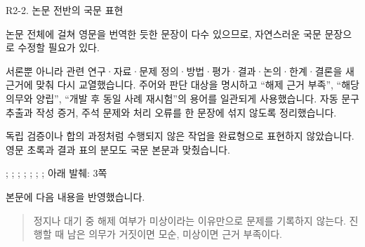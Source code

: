 \begin{reviewitem}{R2-2. 논문 전반의 국문 표현}

\begin{reviewercomment}

논문 전체에 걸쳐 영문을 번역한 듯한 문장이 다수 있으므로, 자연스러운 국문 문장으로 수정할 필요가 있다.

\end{reviewercomment}

\begin{authorresponse}

서론뿐 아니라 관련 연구·자료·문제 정의·방법·평가·결과·논의·한계·결론을 새 근거에 맞춰 다시 교열했습니다. 주어와 판단 대상을 명시하고 ``해제 근거 부족'', ``해당 의무와 양립'', ``개발 후 동일 사례 재시험''의 용어를 일관되게 사용했습니다. 자동 문구 추출과 작성 증거, 주석 문제와 처리 오류를 한 문장에 섞지 않도록 정리했습니다.

독립 검증이나 합의 과정처럼 수행되지 않은 작업을 완료형으로 표현하지 않았습니다. 영문 초록과 결과 표의 분모도 국문 본문과 맞췄습니다.

\end{authorresponse}

\begin{manuscriptrevision}{; ; ; ; ; ; ; 아래 발췌: 3쪽}

본문에 다음 내용을 반영했습니다.

\begin{quote}

정지나 대기 중 해제 여부가 미상이라는 이유만으로 문제를 기록하지 않는다. 진행할 때 남은 의무가 거짓이면 모순, 미상이면 근거 부족이다.

\end{quote}

\end{manuscriptrevision}

\end{reviewitem}

\clearpage

